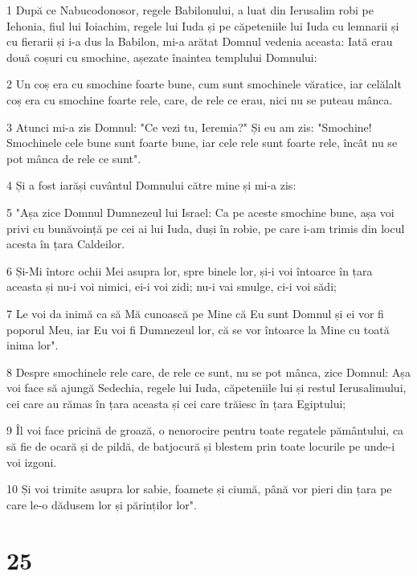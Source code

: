 \par 1 După ce Nabucodonosor, regele Babilonului, a luat din Ierusalim robi pe Iehonia, fiul lui Ioiachim, regele lui Iuda și pe căpeteniile lui Iuda cu lemnarii și cu fierarii și i-a dus la Babilon, mi-a arătat Domnul vedenia aceasta: Iată erau două coșuri cu smochine, așezate înaintea templului Domnului:
\par 2 Un coș era cu smochine foarte bune, cum sunt smochinele văratice, iar celălalt coș era cu smochine foarte rele, care, de rele ce erau, nici nu se puteau mânca.
\par 3 Atunci mi-a zis Domnul: "Ce vezi tu, Ieremia?" Și eu am zis: "Smochine! Smochinele cele bune sunt foarte bune, iar cele rele sunt foarte rele, încât nu se pot mânca de rele ce sunt".
\par 4 Și a fost iarăși cuvântul Domnului către mine și mi-a zis:
\par 5 "Așa zice Domnul Dumnezeul lui Israel: Ca pe aceste smochine bune, așa voi privi cu bunăvoință pe cei ai lui Iuda, duși în robie, pe care i-am trimis din locul acesta în țara Caldeilor.
\par 6 Și-Mi întorc ochii Mei asupra lor, spre binele lor, și-i voi întoarce în țara aceasta și nu-i voi nimici, ei-i voi zidi; nu-i vai smulge, ci-i voi sădi;
\par 7 Le voi da inimă ca să Mă cunoască pe Mine că Eu sunt Domnul și ei vor fi poporul Meu, iar Eu voi fi Dumnezeul lor, că se vor întoarce la Mine cu toată inima lor".
\par 8 Despre smochinele rele care, de rele ce sunt, nu se pot mânca, zice Domnul: Așa voi face să ajungă Sedechia, regele lui Iuda, căpeteniile lui și restul Ierusalimului, cei care au rămas în țara aceasta și cei care trăiesc în țara Egiptului;
\par 9 Îl voi face pricină de groază, o nenorocire pentru toate regatele pământului, ca să fie de ocară și de pildă, de batjocură și blestem prin toate locurile pe unde-i voi izgoni.
\par 10 Și voi trimite asupra lor sabie, foamete și ciumă, până vor pieri din țara pe care le-o dădusem lor și părinților lor".

\chapter{25}

